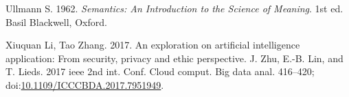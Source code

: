 \documentclass[a4paper,11pt,oneside,oldfontcommands]{memoir}
\theoremstyle{definition}
\theoremstyle{break}		%
\numberwithin{equation}{chapter}
\numberwithin{figure}{chapter}
\begin{document}
\leavevmode\hypertarget{ref-Ullmann:1979sL}{}%
Ullmann S. 1962. \emph{Semantics: An Introduction to the Science of
Meaning}. 1st ed. Basil Blackwell, Oxford.

\leavevmode\hypertarget{ref-XiuquanLi2017}{}%
Xiuquan Li, Tao Zhang. 2017. An exploration on artificial intelligence
application: From security, privacy and ethic perspective. J. Zhu, E.-B.
Lin, and T. Lieds. 2017 ieee 2nd int. Conf. Cloud comput. Big data anal.
416--420;
doi:\href{https://doi.org/10.1109/ICCCBDA.2017.7951949}{10.1109/ICCCBDA.2017.7951949}.



\printindex

\end{document}
